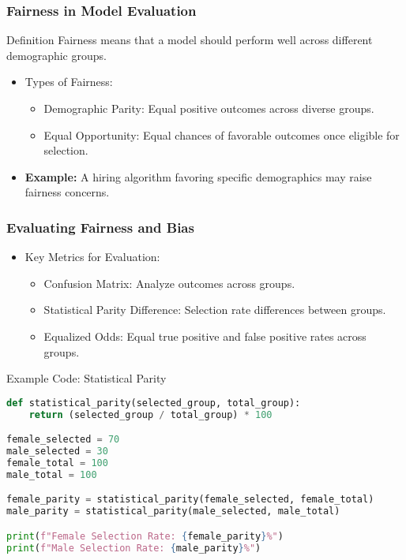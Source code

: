 \documentclass[aspectratio=169]{beamer}
\begin{document}
\begin{frame}
    \frametitle{Fairness in Model Evaluation}
    \begin{block}{Definition}
        Fairness means that a model should perform well across different demographic groups.
    \end{block}
    \begin{itemize}
        \item Types of Fairness:
        \begin{itemize}
            \item Demographic Parity: Equal positive outcomes across diverse groups.
            \item Equal Opportunity: Equal chances of favorable outcomes once eligible for selection.
        \end{itemize}
        \item \textbf{Example:} A hiring algorithm favoring specific demographics may raise fairness concerns.
    \end{itemize}
\end{frame}

\begin{frame}[fragile]
    \frametitle{Evaluating Fairness and Bias}
    \begin{itemize}
        \item Key Metrics for Evaluation:
        \begin{itemize}
            \item Confusion Matrix: Analyze outcomes across groups.
            \item Statistical Parity Difference: Selection rate differences between groups.
            \item Equalized Odds: Equal true positive and false positive rates across groups.
        \end{itemize}
    \end{itemize}
    \begin{block}{Example Code: Statistical Parity}
        \begin{lstlisting}[language=Python]
def statistical_parity(selected_group, total_group):
    return (selected_group / total_group) * 100

female_selected = 70
male_selected = 30
female_total = 100
male_total = 100

female_parity = statistical_parity(female_selected, female_total)
male_parity = statistical_parity(male_selected, male_total)

print(f"Female Selection Rate: {female_parity}%")
print(f"Male Selection Rate: {male_parity}%")
        \end{lstlisting}
    \end{block}
\end{frame}
\end{document}
